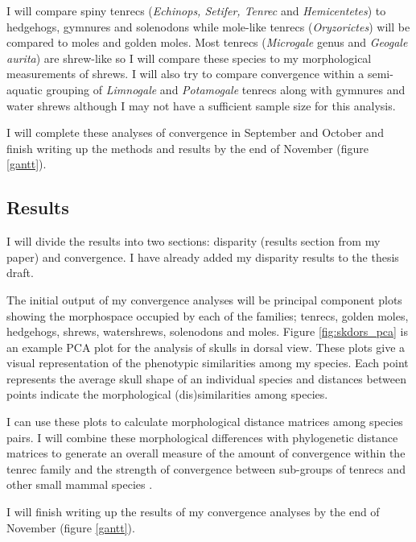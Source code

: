 \documentclass[12pt,a4paper]{article}
\begin{document}
	I will compare spiny tenrecs (\textit{Echinops, Setifer, Tenrec} and \textit{Hemicentetes}) to hedgehogs, gymnures and solenodons while mole-like tenrecs (\textit{Oryzorictes}) will be compared to moles and golden moles. Most tenrecs (\textit{Microgale} genus and \textit{Geogale aurita}) are shrew-like so I will compare these species to my morphological measurements of shrews. I will also try to compare convergence within a semi-aquatic grouping of \textit{Limnogale} and \textit{Potamogale} tenrecs along with gymnures and water shrews although I may not have a sufficient sample size for this analysis. 
		
	I will complete these analyses of convergence in September and October and finish writing up the methods and results by the end of November (figure \ref{gantt}).

 
\subsection{Results}
	
	I will divide the results into two sections: disparity (results section from my paper) and convergence. I have already added my disparity results to the thesis draft.
	
	The initial output of my convergence analyses will be principal component plots showing the morphospace occupied by each of the families; tenrecs, golden moles, hedgehogs, shrews, watershrews, solenodons and moles. Figure \ref{fig:skdors_pca} is an example PCA plot for the analysis of skulls in dorsal view. These plots give a visual representation of the phenotypic similarities among my species. Each point represents the average skull shape of an individual species and distances between points indicate the morphological (dis)similarities among species.
	
	I can use these plots to calculate morphological distance matrices among species pairs. I will combine these morphological differences with phylogenetic distance matrices to generate an overall measure of the amount of convergence within the tenrec family \citep{Stayton2008} and the strength of convergence between sub-groups of tenrecs and other small mammal species \citep{Arbuckle2014}.

	I will finish writing up the results of my convergence analyses by the end of November (figure \ref{gantt}).

	
\end{document}
